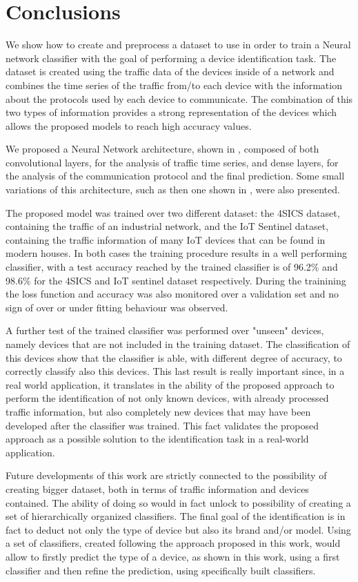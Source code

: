 \chapter{Conclusions}

We show how to create and preprocess a dataset to use in order to train a Neural network classifier with the goal of performing a device identification task. The dataset is created using the traffic data of the devices inside of a network and combines the time series of the traffic from/to each device with the information about the protocols used by each device to communicate.
The combination of this two types of information provides a strong representation of the devices which allows the proposed models to reach high accuracy values.

We proposed a Neural Network architecture, shown in , composed of both convolutional layers, for the analysis of traffic time series, and dense layers, for the analysis of the communication protocol and the final prediction. Some small variations of this architecture, such as then one shown in , were also presented. 

The proposed model was trained over two different dataset: the 4SICS dataset, containing the traffic of an industrial network, and the IoT Sentinel dataset, containing the traffic information of many IoT devices that can be found in modern houses. In both cases the training procedure results in a well performing classifier, with a test  accuracy reached by the trained classifier is of 96.2\% and 98.6\% for the 4SICS and IoT sentinel dataset respectively. During the trainining the loss function and accuracy was also monitored over a validation set and no sign of over or under fitting behaviour was observed.

A further test of the trained classifier was performed over "unseen" devices, namely devices that are not included in the training dataset. The classification of this devices show that the classifier is able, with different degree of accuracy, to correctly classify also this devices. This last result is really important since, in a real world application, it translates in the ability of the proposed approach to perform the identification of not only known devices, with already processed traffic information, but also completely new devices that may have been developed after the classifier was trained. This fact validates the proposed approach as a possible solution to the identification task in a real-world application.

Future developments of this work are strictly connected to the possibility of creating bigger dataset, both in terms of traffic information and devices contained. The ability of doing so would in fact unlock to possibility of creating a set of hierarchically organized classifiers. The final goal of the identification is in fact to deduct not only the type of device but also its brand and/or model. Using a set of classifiers, created following the approach proposed in this work, would allow to firstly predict the type of a device, as shown in this work, using a first classifier and then refine the prediction, using specifically built classifiers. 

